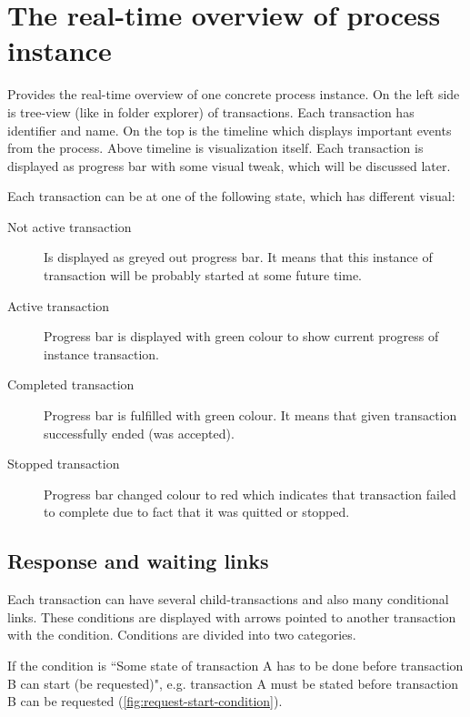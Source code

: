     \section{The real-time overview of process instance}
    Provides the real-time overview of one concrete process instance.
On the left side is tree-view (like in folder explorer) of transactions. Each transaction has identifier and name.
On the top is the timeline which displays important events from the process. Above timeline is visualization itself. Each transaction is displayed as progress bar with some visual tweak, which will be discussed later.

	Each transaction can be at one of the following state, which has different visual: 
    
    \begin{description}
    	\item[Not active transaction] Is displayed as greyed out progress bar. It means that this instance of transaction will be probably started at some future time.

        \item[Active transaction] Progress bar is displayed with green colour to show current progress of instance transaction. 
        
        \item[Completed transaction] Progress bar is fulfilled with green colour. It means that given transaction successfully ended (was accepted).
        
        \item[Stopped transaction] Progress bar changed colour to red which indicates that transaction failed to complete due to fact that it was quitted or stopped. 
    \end{description}
    
 \subsection{Response and waiting links}
   Each transaction can have several child-transactions and also many conditional links. These conditions are displayed with arrows pointed to another transaction with the condition.
Conditions are divided into two categories.

If the condition is ``Some state of transaction A has to be done before transaction B can start (be requested)", e.g. transaction A must be stated before transaction B can be requested (\cref{fig:request-start-condition}).

